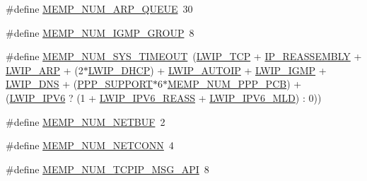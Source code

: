 \begin{DoxyCompactItemize}
\item 
\#define \hyperlink{group__lwip__opts__memp_ga087b00ea20a7edebcad33a1a1353a5d7}{M\+E\+M\+P\+\_\+\+N\+U\+M\+\_\+\+A\+R\+P\+\_\+\+Q\+U\+E\+UE}~30
\item 
\#define \hyperlink{group__lwip__opts__memp_gab648ff95d8ffa4216b95f82a568a5d9a}{M\+E\+M\+P\+\_\+\+N\+U\+M\+\_\+\+I\+G\+M\+P\+\_\+\+G\+R\+O\+UP}~8
\item 
\#define \hyperlink{group__lwip__opts__memp_ga4afbdca581a58d57bc7a81118a95327e}{M\+E\+M\+P\+\_\+\+N\+U\+M\+\_\+\+S\+Y\+S\+\_\+\+T\+I\+M\+E\+O\+UT}~(\hyperlink{group__lwip__opts__tcp_gaa4ed98deb97b77c633cb8870f34c71e9}{L\+W\+I\+P\+\_\+\+T\+CP} + \hyperlink{group__lwip__opts__ipv4_ga1a31ab0e0f37b17d40fa7c35bc2c4f69}{I\+P\+\_\+\+R\+E\+A\+S\+S\+E\+M\+B\+LY} + \hyperlink{group__lwip__opts__arp_ga9609a014bba4638cc191d6a8f9556c87}{L\+W\+I\+P\+\_\+\+A\+RP} + (2$\ast$\hyperlink{openmote-cc2538_2lwip_2test_2unit_2lwipopts_8h_a8a6ec62dc121064ac591b1fd8567bee9}{L\+W\+I\+P\+\_\+\+D\+H\+CP}) + \hyperlink{group__lwip__opts__autoip_gaaf1b3a089827223589baf1b7f4f57069}{L\+W\+I\+P\+\_\+\+A\+U\+T\+O\+IP} + \hyperlink{openmote-cc2538_2lwip_2test_2unit_2lwipopts_8h_adaf25915ae1fd69c0943ef68cbb38923}{L\+W\+I\+P\+\_\+\+I\+G\+MP} + \hyperlink{group__lwip__opts__dns_ga98710dd81446b7cb2daac736bae6f646}{L\+W\+I\+P\+\_\+\+D\+NS} + (\hyperlink{openmote-cc2538_2lwip_2src_2include_2netif_2ppp_2ppp__opts_8h_a746c0ebaef5399987d53a1426eba6273}{P\+P\+P\+\_\+\+S\+U\+P\+P\+O\+RT}$\ast$6$\ast$\hyperlink{openmote-cc2538_2lwip_2src_2include_2netif_2ppp_2ppp__opts_8h_a6721ea95cbd6afd6968470c2423b6482}{M\+E\+M\+P\+\_\+\+N\+U\+M\+\_\+\+P\+P\+P\+\_\+\+P\+CB}) + (\hyperlink{openmote-cc2538_2lwip_2test_2fuzz_2lwipopts_8h_a872e3bb3fe2212156d66b18fccc9643f}{L\+W\+I\+P\+\_\+\+I\+P\+V6} ? (1 + \hyperlink{group__lwip__opts__ipv6_gad0ef160d72e63b02c5e875b06ec53864}{L\+W\+I\+P\+\_\+\+I\+P\+V6\+\_\+\+R\+E\+A\+SS} + \hyperlink{group__lwip__opts__mld6_ga44d8f24eaebbc50221ac1336212a3528}{L\+W\+I\+P\+\_\+\+I\+P\+V6\+\_\+\+M\+LD}) \+: 0))
\item 
\#define \hyperlink{group__lwip__opts__memp_ga5d99df65869ac101ed6a611fc85016be}{M\+E\+M\+P\+\_\+\+N\+U\+M\+\_\+\+N\+E\+T\+B\+UF}~2
\item 
\#define \hyperlink{group__lwip__opts__memp_gacb40bd726b7e15593b20a628d298f456}{M\+E\+M\+P\+\_\+\+N\+U\+M\+\_\+\+N\+E\+T\+C\+O\+NN}~4
\item 
\#define \hyperlink{group__lwip__opts__memp_gafbbfd6ce8536038cd00fa85bebae987c}{M\+E\+M\+P\+\_\+\+N\+U\+M\+\_\+\+T\+C\+P\+I\+P\+\_\+\+M\+S\+G\+\_\+\+A\+PI}~8

\end{DoxyCompactItemize}
